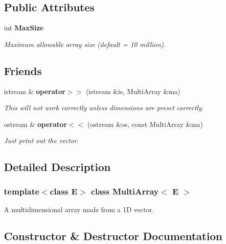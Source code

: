 \subsection*{Public Attributes}
\begin{CompactItemize}
\item 
int {\bf Max\-Size}
\begin{CompactList}\small\item\em Maximum allowable array size (default = 10 million).\item\end{CompactList}\end{CompactItemize}
\subsection*{Friends}
\begin{CompactItemize}
\item 
istream \& {\bf operator$>$$>$} (istream \&is, Multi\-Array \&ma)
\begin{CompactList}\small\item\em This will not work correctly unless dimensions are preset correctly.\item\end{CompactList}\item 
ostream \& {\bf operator$<$$<$} (ostream \&os, const Multi\-Array \&ma)
\begin{CompactList}\small\item\em Just print out the vector.\item\end{CompactList}\end{CompactItemize}


\subsection{Detailed Description}
\subsubsection*{template$<$class E$>$ class Multi\-Array$<$ E $>$}

A multidimensional array made from a 1D vector.



\subsection{Constructor \& Destructor Documentation}
